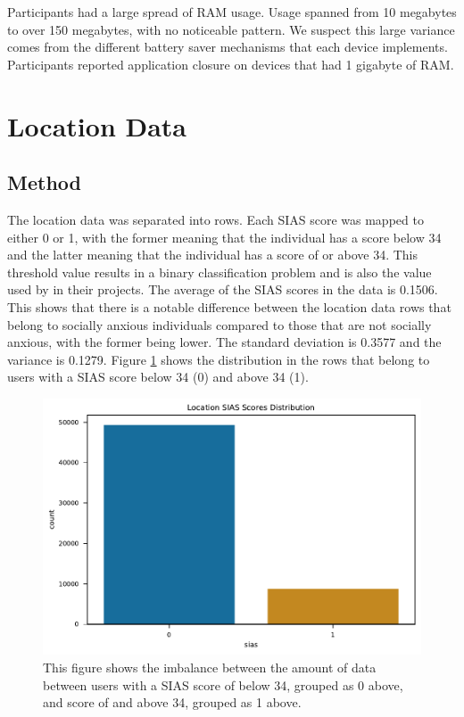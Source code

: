\documentclass{l4proj}
\begin{document}
Participants had a large spread of RAM usage. Usage spanned from 10 megabytes to over 150 megabytes, with no noticeable pattern. We suspect this large variance comes from the different battery saver mechanisms that each device implements. Participants reported application closure on devices that had 1 gigabyte of RAM.

\section{Location Data}
\subsection{Method}
The location data was separated into rows. Each SIAS score was mapped to either 0 or 1, with the former meaning that the individual has a score below 34 and the latter meaning that the individual has a score of or above 34. This threshold value results in a binary classification problem and is also the value used by \cite{wood, boukhechba} in their projects. The average of the SIAS scores in the data is \num{0.1506}. This shows that there is a notable difference between the location data  rows that belong to socially anxious individuals compared to those that are not socially anxious, with the former being lower. The standard deviation is \num{0.3577} and the variance is \num{0.1279}. Figure \ref{fig:location_sias_scores_distribution} shows the distribution in the rows that belong to users with a SIAS score below 34 (0) and above 34 (1).

\begin{figure}[htb]
    \centering
    \includegraphics[width=0.85\linewidth]{images/location/bar_chart_Location_SIAS_Scores_Distribution.pdf}
    \caption{This figure shows the imbalance between the amount of data between users with a SIAS score of below 34, grouped as 0 above, and score of and above 34, grouped as 1 above.}
    \label{fig:location_sias_scores_distribution} 
\end{figure}
\end{document}

